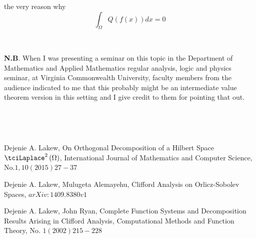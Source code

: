 \documentclass{amsproc}
\theoremstyle{plain}
\numberwithin{equation}{section}
\begin{document}
the very reason why $\ $\begin{equation*}
\int_{\Omega }Q(f(x))dx=0
\end{equation*}

\ \ \ \ 

\textbf{N.B}. When I was presenting a seminar on this topic in the
Department of Mathematics and Applied Mathematics regular analysis, logic
and physics seminar, at Virginia Commonwealth University, faculty members
from the audience indicated to me that this probably might be an
intermediate value theorem version in this setting and I give credit to them
for pointing that out.

\bigskip

\ \ \ 

\ \ \ \ \ \ \ \ \ \ \ \ \ \ \ \ \ \ \ \ \ \ \ \ \ \ \ \ \ 

\begin{thebibliography}{9}
 Dejenie A. Lakew, On Orthogonal Decomposition of a Hilbert
Space $\tciLaplace ^{2}\left( \Omega \right) $, International Journal of
Mathematics and Computer Science, No$.1,10(2015)27-37$

 Dejenie A. Lakew, Mulugeta Alemayehu, Clifford Analysis on
Orlicz-Sobolev Spaces, $arXiv:1409.8380v1$

 Dejenie A. Lakew, John Ryan, Complete Function Systems and
Decomposition Results Arising in Clifford Analysis, Computational Methods
and Function Theory, No. $1(2002)215-228$
\end{thebibliography}

\ 
\end{document}
